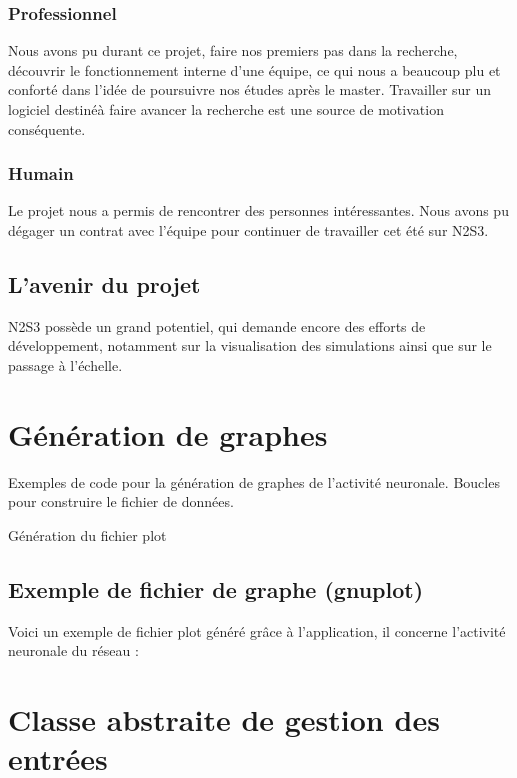 \documentclass[a4paper,10pt]{article}
\begin{document}
\subsubsection*{Professionnel}
Nous avons pu durant ce projet, faire nos premiers pas dans la recherche, découvrir le fonctionnement interne d'une équipe, ce qui nous a beaucoup plu et conforté dans l'idée de poursuivre nos études après le master. Travailler sur un logiciel destinéà faire avancer la recherche est une source de motivation conséquente.

\subsubsection*{Humain}
Le projet nous a permis de rencontrer des personnes intéressantes. Nous avons pu dégager un contrat avec l'équipe pour continuer de travailler cet été sur N2S3.

\subsection*{L'avenir du projet}
N2S3 possède un grand potentiel, qui demande encore des efforts de développement, notamment sur la visualisation des simulations ainsi que sur le passage à l'échelle.

\newpage

\appendix
\section{Génération de graphes}
Exemples de code pour la génération de graphes de l'activité neuronale.
\label{gen_graph}
Boucles pour construire le fichier de données.

Génération du fichier plot

\subsection{Exemple de fichier de graphe (gnuplot)}
Voici un exemple de fichier plot généré grâce à l'application, il concerne l'activité neuronale du réseau : 


\section{Classe abstraite de gestion des entrées}
\label{input_generator}

\end{document}
